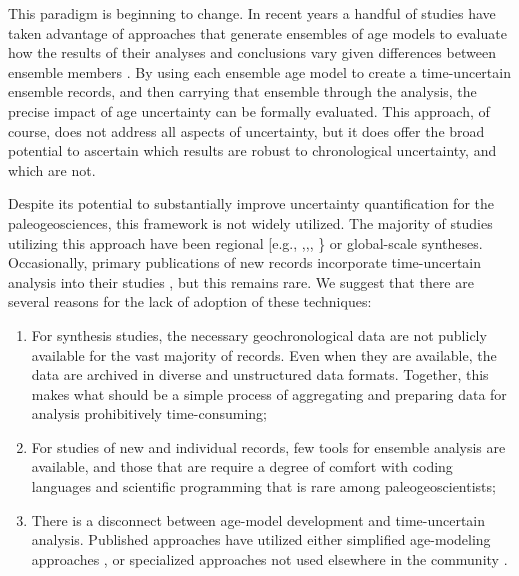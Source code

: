\documentclass[gc, manuscript]{copernicus}
\begin{document}
This paradigm is beginning to change. In recent years a handful of
studies have taken advantage of approaches that generate ensembles of
age models to evaluate how the results of their analyses and conclusions
vary given differences between ensemble members
\citep[\citet{Rhines_JGR2011},\citet{Anchukaitis_Tierney2012},\citet{Shakun_Nature2012},\citet{Marcott_Science2013},
\citet{Tierney2013}]{Haam_Huybers2010}. By using each ensemble age model
to create a time-uncertain ensemble records, and then carrying that
ensemble through the analysis, the precise impact of age uncertainty can
be formally evaluated. This approach, of course, does not address all
aspects of uncertainty, but it does offer the broad potential to
ascertain which results are robust to chronological uncertainty, and
which are not.

Despite its potential to substantially improve uncertainty
quantification for the paleogeosciences, this framework is not widely
utilized. The majority of studies utilizing this approach have been
regional {[}e.g.,
\citet{Anchukaitis_Tierney2012},\citet{Tierney2013},\citet{mckay_onset_2018},
\citet{routson2018}\} or global-scale
\citep[e.g.,][\citet{Marcott_Science2013},\citet{kaufman2020HoloceneGMST}]{Shakun_Nature2012}
syntheses. Occasionally, primary publications of new records incorporate
time-uncertain analysis into their studies \citep[more]{Boldt2015}, but
this remains rare. We suggest that there are several reasons for the
lack of adoption of these techniques:

\begin{enumerate}
\def\labelenumi{\arabic{enumi}.}
\item
  For synthesis studies, the necessary geochronological data are not
  publicly available for the vast majority of records. Even when they
  are available, the data are archived in diverse and unstructured data
  formats. Together, this makes what should be a simple process of
  aggregating and preparing data for analysis prohibitively
  time-consuming;
\item
  For studies of new and individual records, few tools for ensemble
  analysis are available, and those that are require a degree of comfort
  with coding languages and scientific programming that is rare among
  paleogeoscientists;
\item
  There is a disconnect between age-model development and time-uncertain
  analysis. Published approaches have utilized either simplified
  age-modeling approaches \citep{Haam_Huybers2010}, or specialized
  approaches not used elsewhere in the community
  \citep[\citet{Anchukaitis_Tierney2012},\citet{Marcott_Science2013},\citet{Tierney2013},\citet{routson2018}]{Shakun_Nature2012}.
\end{enumerate}
\end{document}
